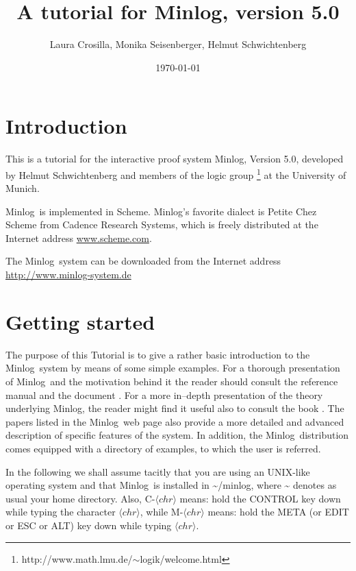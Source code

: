 \documentclass[12pt]{amsart}
\author[L. Crosilla, M. Seisenberger, H. Schwichtenberg]
{Laura Crosilla, Monika Seisenberger, Helmut Schwichtenberg}
\date{\today}
\title[Minlog tutorial]{A tutorial for Minlog, version 5.0}
\newcommand{\mi}{Minlog}
\newcommand{\mdir}{\~{}/minlog}
\begin{document}
\maketitle

\section{Introduction}
This is a tutorial for the interactive proof system \mi, Version 5.0,
developed by Helmut Schwichtenberg and members of the logic group%
\footnote{http://www.math.lmu.de/$\sim$logik/welcome.html}
at the University of Munich.

\mi\ is implemented in Scheme.
\mi's favorite dialect is Petite Chez Scheme from Cadence Research Systems,
which is freely distributed at the Internet address \url{www.scheme.com}.

The \mi\ system can be downloaded from the Internet address
\url{http://www.minlog-system.de}


\section{Getting started}
The purpose of this Tutorial is to give a rather basic introduction to
the \mi\ system by means of some simple examples.  For a thorough
presentation of \mi\ and the motivation behind it the reader should
consult the reference manual \cite{minlogman} and the document
\cite{tcf}.  For a more in--depth presentation of the theory
underlying \mi, the reader might find it useful also to consult the
book \cite{SchwichtenbergWainer12}.  The papers listed in
the \mi\ web page also provide a more detailed and advanced
description of specific features of the system.  In addition, the \mi\
distribution comes equipped with a directory of examples, to which the
user is referred.

In the following we shall assume tacitly that you are using an
UNIX-like operating system and that \mi\ is installed in \mdir, where
\~{} denotes as usual your home directory.  Also, C-$\langle
chr\rangle$ means: hold the CONTROL key down while typing the
character $\langle chr \rangle$, while M-$\langle chr \rangle$ means:
hold the META (or EDIT or ESC or ALT) key down while typing $\langle
chr \rangle$.
\end{document}
